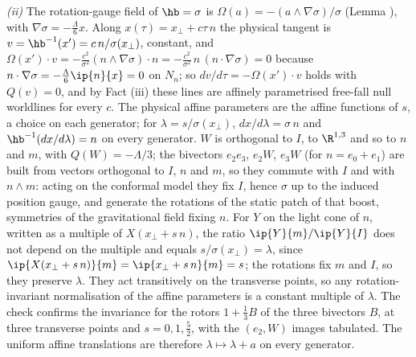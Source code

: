 \emph{(ii)} The rotation-gauge field of $\hb = \sigma$ is $\Omega(a) = -(a \wedge \nabla\sigma)/\sigma$ (Lemma ), with $\nabla\sigma = -\tfrac{\Lambda}{6}x$. Along $x(\tau) = x_{\perp} + c\tau\,n$ the physical tangent is $v = \hb^{-1}(x') = c\,n/\sigma(x_{\perp})$, constant, and $\Omega(x')\cdot v = -\tfrac{c^{2}}{\sigma^{2}}(n \wedge \nabla\sigma)\cdot n = -\tfrac{c^{2}}{\sigma^{2}}\,n\,(n\cdot\nabla\sigma) = 0$ because $n \cdot \nabla\sigma = -\tfrac{\Lambda}{6}\ip{n}{x} = 0$ on $N_{n}$; so $dv/d\tau = -\Omega(x')\cdot v$ holds with $Q(v) = 0$, and by Fact (iii) these lines are affinely parametrised free-fall null worldlines for every $c$. The physical affine parameters are the affine functions of $s$, a choice on each generator; for $\lambda = s/\sigma(x_{\perp})$, $dx/d\lambda = \sigma\,n$ and $\hb^{-1}(dx/d\lambda) = n$ on every generator. $W$ is orthogonal to $I$, to $\R^{1,3}$ and so to $n$ and $m$, with $Q(W) = -\Lambda/3$; the bivectors $e_{2}e_{3}$, $e_{2}W$, $e_{3}W$ (for $n = e_{0} + e_{1}$) are built from vectors orthogonal to $I$, $n$ and $m$, so they commute with $I$ and with $n \wedge m$: acting on the conformal model they fix $I$, hence $\sigma$ up to the induced position gauge, and generate the rotations of the static patch of that boost, symmetries of the gravitational field fixing $n$. For $Y$ on the light cone of $n$, written as a multiple of $X(x_{\perp} + s\,n)$, the ratio $\ip{Y}{m}/\ip{Y}{I}$ does not depend on the multiple and equals $s/\sigma(x_{\perp}) = \lambda$, since $\ip{X(x_{\perp} + s\,n)}{m} = \ip{x_{\perp} + s\,n}{m} = s$; the rotations fix $m$ and $I$, so they preserve $\lambda$. They act transitively on the transverse points, so any rotation-invariant normalisation of the affine parameters is a constant multiple of $\lambda$. The check confirms the invariance for the rotors $1 + \tfrac13 B$ of the three bivectors $B$, at three transverse points and $s = 0, 1, \tfrac52$, with the $(e_{2}, W)$ images tabulated. The uniform affine translations are therefore $\lambda \mapsto \lambda + a$ on every generator.

